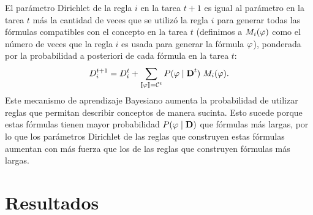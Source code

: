 El parámetro Dirichlet de la regla $i$ en la tarea $t+1$ es igual al parámetro en la tarea $t$ más la cantidad de veces que se utilizó la regla $i$ para generar todas las fórmulas compatibles con el concepto en la tarea $t$ (definimos a $M_{i}(\varphi)$ como el número de veces que la regla $i$ es usada para generar la fórmula $\varphi$), ponderada por la probabilidad a posteriori de cada fórmula en la tarea $t$:
 \begin{equation}
 D_{i}^{t+1}=D_{i}^{t}+\sum_{\llbracket \varphi\rrbracket=\mathcal{C}^t} P(\varphi\mid \textbf{D}^{t}) \ M_{i}(\varphi).
 \label{Dirichlet}
 \end{equation}
%
Este mecanismo de aprendizaje Bayesiano aumenta la probabilidad de utilizar reglas que permitan describir conceptos de manera sucinta. Esto sucede porque estas fórmulas tienen mayor probabilidad $P(\varphi\mid \textbf{D})$ que fórmulas más largas, por lo que los parámetros Dirichlet de las reglas que construyen estas fórmulas aumentan con más fuerza que los de las reglas que construyen fórmulas más largas.   

\section{Resultados}

